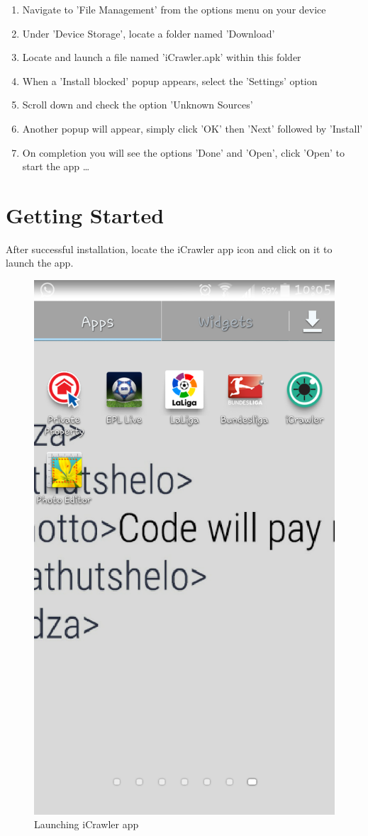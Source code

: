 \documentclass[hidelinks, 12pt, oneside]{article}
\begin{document}
	 \begin{enumerate}
 	 	\item Navigate to 'File Management' from the options menu on your device
 	 	\item Under 'Device Storage', locate a folder named 'Download'
 	 	\item Locate and launch a file named 'iCrawler.apk' within this folder
 	 	\item When a 'Install blocked' popup appears, select the 'Settings' option
 	 	\item Scroll down and check the option 'Unknown Sources'
 	 	\item Another popup will appear, simply click 'OK' then 'Next' followed by 'Install'
 	 	\item On completion you will see the options 'Done' and 'Open', click 'Open' to start the app \ldots
 	\end{enumerate}\newpage


	\section{Getting Started}
	After successful installation, locate the iCrawler app icon and click on it to launch the app.
	 \begin{figure}[h!]
	 	 \caption{Launching iCrawler app}
	 	 \centering 																																	\includegraphics[width=0.5 \textwidth]{img/newImgs/appLaunch.png}
	 \end{figure}\newpage
	 
\end{document}
